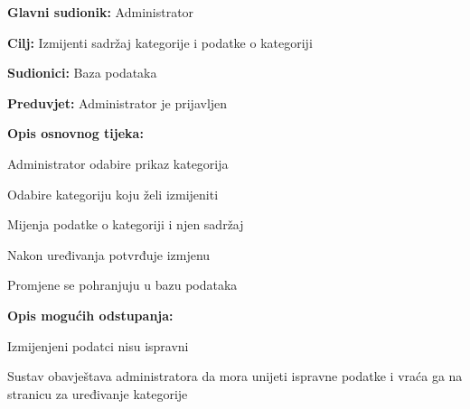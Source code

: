 					\noindent {}
					\begin{packed_item}
						
						\item \textbf{Glavni sudionik:} Administrator
						\item  \textbf{Cilj:} Izmijenti sadržaj kategorije i podatke o kategoriji
						\item  \textbf{Sudionici:} Baza podataka
						\item  \textbf{Preduvjet:} Administrator je prijavljen
						\item  \textbf{Opis osnovnog tijeka:}
						
						\item[] \begin{packed_enum}
							
							\item Administrator odabire prikaz kategorija
							\item Odabire kategoriju koju želi izmijeniti
							\item Mijenja podatke o kategoriji i njen sadržaj
							\item Nakon uređivanja potvrđuje izmjenu
							\item Promjene se pohranjuju u bazu podataka
							
						\end{packed_enum}
						
						\item  \textbf{Opis mogućih odstupanja:}
						
						\item[] \begin{packed_item}
							
							\item[3.a] Izmijenjeni podatci nisu ispravni 
							\item[] \begin{packed_enum}
								
								\item Sustav obavještava administratora da mora unijeti ispravne podatke i vraća ga na stranicu za uređivanje kategorije
							\end{packed_enum}
							
						\end{packed_item}
						
					\end{packed_item}
				
